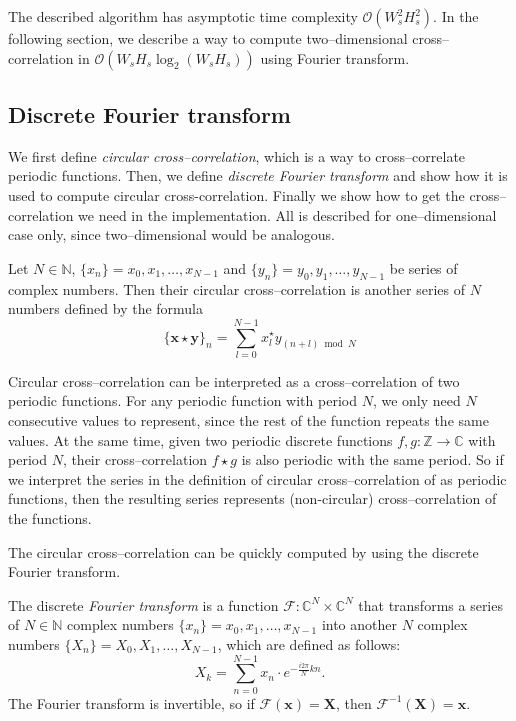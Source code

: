The described algorithm has asymptotic time complexity $\mathcal{O}(W_s^2H_s^2)$. In the following section, we describe a way to compute two--dimensional cross--correlation in $\mathcal{O}(W_sH_s\log_2(W_sH_s))$ using Fourier transform.

\subsection{Discrete Fourier transform}
\label{fft}

We first define \emph{circular cross--correlation}, which is a way to cross--correlate periodic functions. Then, we define \emph{discrete Fourier transform} and show how it is used to compute circular cross-correlation. Finally we show how to get the cross--correlation we need in the implementation. All is described for one--dimensional case only, since two--dimensional would be analogous.

Let $N \in \mathbb{N}$, $\{x_n\} = x_0, x_1, \dots , x_{N-1}$ and $\{y_n\} = y_0, y_1, \dots , y_{N-1}$ be series of complex numbers. Then their circular cross--correlation is another series of $N$ numbers defined by the formula
\[
\{\mathbf{x} \star \mathbf{y}\}_n = \sum_{l=0}^{N-1}x^\star_ly_{(n+l)\bmod N}
\]


Circular cross--correlation can be interpreted as a cross--correlation of two periodic functions. For any periodic function with period $N$, we only need $N$ consecutive values to represent, since the rest of the function repeats the same values. At the same time, given two periodic discrete functions $f, g : \mathbb{Z} \rightarrow \mathbb{C}$ with period $N$, their cross--correlation $f \star g$ is also periodic with the same period. So if we interpret the series in the definition of circular cross--correlation of as periodic functions, then the resulting series represents (non-circular) cross--correlation of the functions.

The circular cross--correlation can be quickly computed by using the discrete Fourier transform.

The discrete \emph{Fourier transform} is a function $\mathcal{F}: \mathbb{C}^N \times \mathbb{C}^N$ that transforms a series of $N \in \mathbb{N}$ complex numbers $\{x_n\} = x_0, x_1, \dots , x_{N-1}$ into another $N$ complex numbers $\{X_n\} = X_0, X_1, \dots , X_{N-1}$, which are defined as follows:
\[
X_k = \sum_{n=0}^{N-1} x_n \cdot e^{-\frac{i2\pi}{N}kn}.
\]
The Fourier transform is invertible, so if $\mathcal{F}(\mathbf{x}) = \mathbf{X}$, then $\mathcal{F}^{-1}(\mathbf{X}) = \mathbf{x}$.

